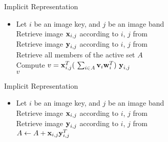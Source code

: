 \begin{frame}{Implicit Representation}
    \begin{itemize}
        \item[\xspace]
            \begin{algorithm}[H]
                \SetAlgoLined
                     {
                        Let $i$ be an image key, and $j$ be an image band \\
                        Retrieve image $\boldsymbol{\mathbf{x}}_{i,j}$ according to $i$, $j$ from \usno \\
                        Retrieve image $\boldsymbol{\mathbf{y}}_{i,j}$ according to $i$, $j$ from \panstarrs \\
                        Retrieve all members of the active set $A$ \\
                        Compute $v = \boldsymbol{\mathbf{x}}_{i,j}^T (\ \sum_{i \in A} \boldsymbol{\mathbf{v}}_i \boldsymbol{\mathbf{w}}_i^T )\ \boldsymbol{\mathbf{y}}_{i,j}$ \\
                        \Return $v$
                    }
                \caption{Pseudo--code for computing the value $v$ \newline 
                for a mission setup using the implicit definition of the \newline
                matrix $\vect{D}$.}
                \label{pscode:compute-v:implicit}
            \end{algorithm}
    \end{itemize}
\end{frame}

\begin{frame}{Implicit Representation}
    \begin{itemize}
        \item[\xspace]
            \begin{algorithm}[H]
                \SetAlgoLined
                     {
                        Let $i$ be an image key, and $j$ be an image band \\
                        Retrieve image $\boldsymbol{\mathbf{x}}_{i,j}$ according to $i$, $j$ from \usno \\
                        Retrieve image $\boldsymbol{\mathbf{y}}_{i,j}$ according to $i$, $j$ from \panstarrs \\
                        $A \gets A + \boldsymbol{\mathbf{x}}_{i,j}\boldsymbol{\mathbf{y}}_{i,j}^T$ \\
                    }
                \caption{Pseudo--code for updating the implicit \newline 
                representation of the matrix $\vect{D}$.}
                \label{pscode:update-d:implicit}
            \end{algorithm}
    \end{itemize}
\end{frame}